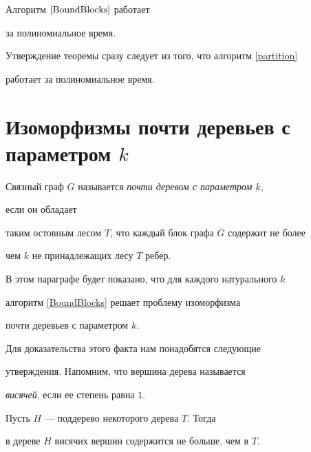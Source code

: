 \begin{thms}\label{tBoundBlocks}


Алгоритм $\ref{BoundBlocks}$ работает


за полиномиальное время.


\end{thms}





Утверждение теоремы сразу следует из того, что алгоритм \ref{partition}


работает за полиномиальное время.








\section{Изоморфизмы почти деревьев с параметром $k$}





\begin{defns}


Связный граф $G$ называется {\it почти деревом с параметром $k$},


если он обладает


таким остовным лесом $T$, что каждый блок графа $G$ содержит не более


чем $k$ не принадлежащих лесу $T$ ребер.


\end{defns}





В этом параграфе будет показано, что для каждого натурального $k$


алгоритм \ref{BoundBlocks} решает проблему изоморфизма


почти деревьев с параметром $k$.





Для доказательства этого факта нам понадобятся следующие


утверждения. Напомним, что вершина дерева называется


{\it висячей}, если ее степень равна $1$.





\begin{lems} \label{SmallLeaf}


Пусть $H$ --- поддерево некоторого дерева $T$. Тогда


в дереве $H$ висячих вершин содержится не больше, чем в $T$.


\end{lems}





